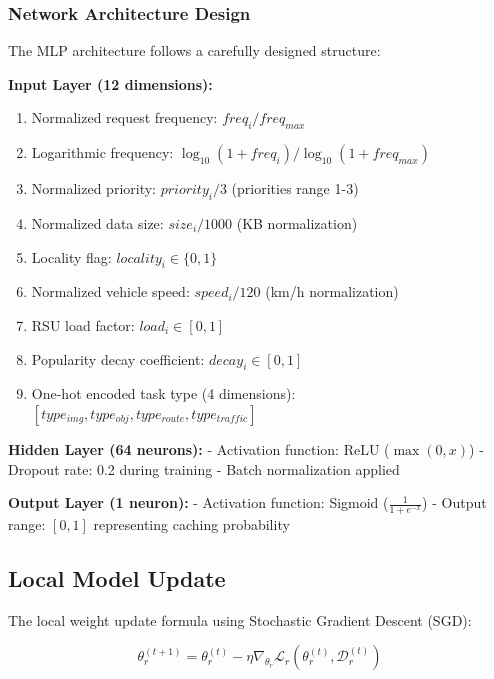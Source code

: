 \documentclass[11pt]{article}
\begin{document}
\subsubsection{Network Architecture Design}

The MLP architecture follows a carefully designed structure:

\textbf{Input Layer (12 dimensions):}
\begin{enumerate}
    \item Normalized request frequency: $freq_i / freq_{max}$
    \item Logarithmic frequency: $\log_{10}(1 + freq_i) / \log_{10}(1 + freq_{max})$
    \item Normalized priority: $priority_i / 3$ (priorities range 1-3)
    \item Normalized data size: $size_i / 1000$ (KB normalization)
    \item Locality flag: $locality_i \in \{0, 1\}$
    \item Normalized vehicle speed: $speed_i / 120$ (km/h normalization)
    \item RSU load factor: $load_i \in [0, 1]$
    \item Popularity decay coefficient: $decay_i \in [0, 1]$
    \item One-hot encoded task type (4 dimensions): $[type_{img}, type_{obj}, type_{route}, type_{traffic}]$
\end{enumerate}

\textbf{Hidden Layer (64 neurons):}
- Activation function: ReLU ($\max(0, x)$)
- Dropout rate: 0.2 during training
- Batch normalization applied

\textbf{Output Layer (1 neuron):}
- Activation function: Sigmoid ($\frac{1}{1 + e^{-x}}$)
- Output range: $[0, 1]$ representing caching probability

\subsection{Local Model Update}

The local weight update formula using Stochastic Gradient Descent (SGD):

\begin{equation}
\theta_r^{(t+1)} = \theta_r^{(t)} - \eta \nabla_{\theta_r} \mathcal{L}_r(\theta_r^{(t)}, \mathcal{D}_r^{(t)})
\label{eq:local_update}
\end{equation}
\end{document}
